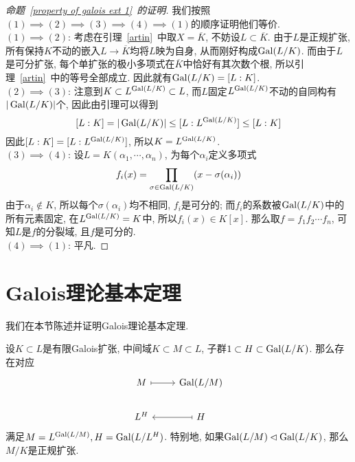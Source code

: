 \begin{proof}[命题~\ref{property of galois ext 1}~的证明]
    我们按照$(1)\implies(2)\implies(3)\implies(4)\implies(1)$的顺序证明他们等价.\\
    $(1)\implies(2)$: 考虑在引理~\ref{artin}~中取$X=\overline{K}$, 不妨设$L\subset\overline{K}$.
    由于$L$是正规扩张, 所有保持$K$不动的嵌入$L\to\overline{K}$均将$L$映为自身, 从而刚好构成$\operatorname{Gal}(L/K)$.
    而由于$L$是可分扩张, 每个单扩张的极小多项式在$\overline{K}$中恰好有其次数个根, 所以引理~\ref{artin}~中的等号全部成立.
    因此就有$\operatorname{Gal}(L/K)=[L:K]$.\\
    $(2)\implies(3)$: 注意到$K\subset L^{\operatorname{Gal}(L/K)}\subset L$, 而$L$固定$L^{\operatorname{Gal}(L/K)}$不动的自同构有$|\operatorname{Gal}(L/K)|$个, 因此由引理可以得到
    \[[L:K]=|\operatorname{Gal}(L/K)|\leq [L:L^{\operatorname{Gal}(L/K)}]\leq [L:K]\]
    因此$[L:K]=[L:L^{\operatorname{Gal}(L/K)}]$, 所以$K=L^{\operatorname{Gal}(L/K)}$.\\
    $(3)\implies(4)$: 设$L=K(\alpha_1,\cdots,\alpha_n)$, 为每个$\alpha_i$定义多项式
    \[f_i(x)=\prod_{\sigma\in\operatorname{Gal}(L/K)}(x-\sigma(\alpha_i))\]
    由于$\alpha_i\notin K$, 所以每个$\sigma(\alpha_i)$均不相同, $f_i$是可分的; 而$f_i$的系数被$\operatorname{Gal}(L/K)$中的所有元素固定, 在$L^{\operatorname{Gal}(L/K)}=K$中, 所以$f_i(x)\in K[x]$.
    那么取$f=f_1f_2\cdots f_n$, 可知$L$是$f$的分裂域, 且$f$是可分的.\\
    $(4)\implies(1)$: 平凡.
\end{proof}

\section{Galois理论基本定理}

我们在本节陈述并证明Galois理论基本定理.

\begin{thm}[Galois理论基本定理]
    设$K\subset L$是有限Galois扩张, 中间域$K\subset M\subset L$, 子群$1\subset H\subset\operatorname{Gal}(L/K)$.
    那么存在对应
    \[\begin{tikzcd}
        M \ar[r, mapsto] & \Gal(L/M)\\
        L^H & \ar[l, mapsto] H
    \end{tikzcd}\]
    满足$M=L^{\operatorname{Gal}(L/M)},H=\operatorname{Gal}(L/L^H)$.
    特别地, 如果$\operatorname{Gal}(L/M)\lhd\operatorname{Gal}(L/K)$, 那么$M/K$是正规扩张.
\end{thm}